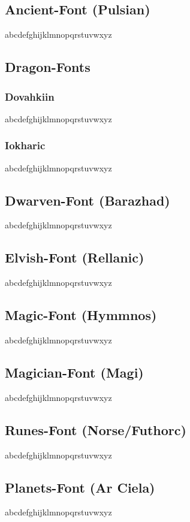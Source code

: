 \documentclass[letterpaper,openany,twoside,twocolumn]{book}
\begin{document}
	\subsection{Ancient-Font (Pulsian)}
	{\ancientfont abcdefghijklmnopqrstuvwxyz}
	
	\subsection{Dragon-Fonts}
	\subsubsection{Dovahkiin}
	{\dovahkiinfont abcdefghijklmnopqrstuvwxyz}
	\subsubsection{Iokharic}
	{\draconicfont abcdefghijklmnopqrstuvwxyz}
	
	\subsection{Dwarven-Font (Barazhad)}
	{\dwarvenfont abcdefghijklmnopqrstuvwxyz}
	
	\subsection{Elvish-Font (Rellanic)}
	{\elvishfont abcdefghijklmnopqrstuvwxyz}
	
	\subsection{Magic-Font (Hymmnos)}
	{\magicfont abcdefghijklmnopqrstuvwxyz}
	
	\subsection{Magician-Font (Magi)}
	{\magicianfont abcdefghijklmnopqrstuvwxyz}
	
	\subsection{Runes-Font (Norse/Futhorc)}
	{\runesfont abcdefghijklmnopqrstuvwxyz}
	
	\subsection{Planets-Font (Ar Ciela)}
	{\planetsfont abcdefghijklmnopqrstuvwxyz}
\end{document}
